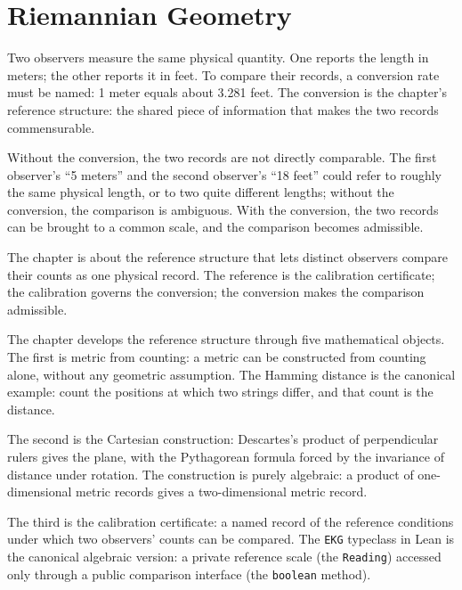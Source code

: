 \chapter{Riemannian Geometry}
\label{chap:riemannian-geometry}


\begin{chapteressay}

Two observers measure the same physical quantity. One reports the
length in meters; the other reports it in feet. To compare their
records, a conversion rate must be named: 1 meter equals about 3.281
feet. The conversion is the chapter's reference structure: the
shared piece of information that makes the two records commensurable.

Without the conversion, the two records are not directly comparable.
The first observer's ``5 meters'' and the second observer's ``18
feet'' could refer to roughly the same physical length, or to two
quite different lengths; without the conversion, the comparison is
ambiguous. With the conversion, the two records can be brought to a
common scale, and the comparison becomes admissible.

The chapter is about the reference structure that lets distinct
observers compare their counts as one physical record. The
reference is the calibration certificate; the calibration governs
the conversion; the conversion makes the comparison admissible.

The chapter develops the reference structure through five
mathematical objects. The first is metric from counting: a metric
can be constructed from counting alone, without any geometric
assumption. The Hamming distance is the canonical example: count
the positions at which two strings differ, and that count is the
distance.

The second is the Cartesian construction: Descartes's product of
perpendicular rulers gives the plane, with the Pythagorean formula
forced by the invariance of distance under rotation. The
construction is purely algebraic: a product of one-dimensional
metric records gives a two-dimensional metric record.

The third is the calibration certificate: a named record of the
reference conditions under which two observers' counts can be
compared. The \texttt{EKG} typeclass in Lean is the canonical
algebraic version: a private reference scale (the
\texttt{Reading}) accessed only through a public comparison
interface (the \texttt{boolean} method).


\end{chapteressay}
